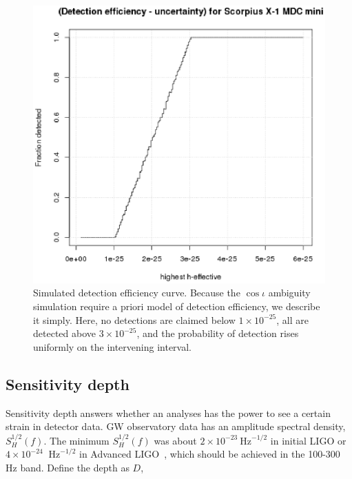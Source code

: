 \begin{figure}
\begin{center}
\includegraphics[trim=0 10 10 5, clip, width=0.70\paperwidth,height=0.48\paperheight]{plots/PlotHeffDistH0DetectionEfficiency200breaks.eps}
\caption{ Simulated detection efficiency curve. Because the $\cos \iota$ ambiguity simulation require a priori model of detection efficiency, we describe it simply. Here, no detections are claimed below $1\times 10^{-25}$, all are detected above $3\times 10^{-25}$, and the probability of detection rises uniformly on the intervening interval.
\label{fig:plotheffdisth0detectionefficiency200breaks}}
\end{center}
\end{figure}

\subsection{Sensitivity depth}
\label{sensitivity-depth-appendix}

Sensitivity depth answers whether an analyses has the power to see a certain strain in detector data.
GW observatory data has an amplitude spectral density, $S_H^{1/2}(f)$.
The minimum $S_H^{1/2}(f)$ was about $2\times 10^{-23}\mathrm{~Hz}^{-1/2}$ in initial LIGO or $4\times 10^{-24}$ $\mathrm{~Hz}^{-1/2}$ in Advanced LIGO~\cite{HarryALIGO2010}, which should be achieved in the 100-300 Hz band.
Define the depth as $D$,

